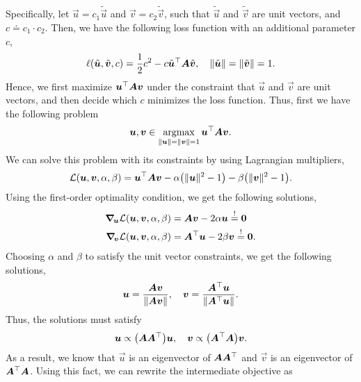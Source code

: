 Specifically, let $\vec{u} = c_1 \tilde{\vec{u}}$ and $\vec{v} = c_2 \tilde{\vec{v}}$, such that
$\tilde{\vec{u}}$ and $\tilde{\vec{v}}$ are unit vectors, and $c \doteq c_1 \cdot c_2$. Then, we
have the following loss function with an additional parameter $c$, \[
    \ell(\tilde{\vec{u}}, \tilde{\vec{v}}, c) = \frac{1}{2} c^2 - c \transpose{\tilde{\vec{u}}} \mat{A} \tilde{\vec{v}}, \quad \| \tilde{\vec{u}} \| = \| \tilde{\vec{v}} \| = 1.
\]
Hence, we first maximize $\transpose{\vec{u}} \mat{A} \vec{v}$ under the constraint that $\vec{u}$
and $\vec{v}$ are unit vectors, and then decide which $c$ minimizes the loss function. Thus, first
we have the following problem \[
    \vec{u}, \vec{v} \in \argmax_{\| \vec{u} \| = \| \vec{v} \| = 1} \transpose{\vec{u}} \mat{A} \vec{v}.
\]
We can solve this problem with its constraints by using Lagrangian multipliers, \[
    \mathcal{L}(\vec{u}, \vec{v}, \alpha, \beta) = \transpose{\vec{u}} \mat{A} \vec{v} - \alpha \lft(\| \vec{u} \|^2 - 1\rgt) - \beta \lft(\| \vec{v} \|^2 - 1\rgt).
\]
Using the first-order optimality condition, we get the following solutions,
\begin{align*}
    \grad{\mathcal{L}(\vec{u}, \vec{v}, \alpha, \beta)}{\vec{u}} & = \mat{A} \vec{v} - 2 \alpha \vec{u} \overset{!}{=} \vec{0}             \\
    \grad{\mathcal{L}(\vec{u}, \vec{v}, \alpha, \beta)}{\vec{v}} & = \transpose{\mat{A}} \vec{u} - 2 \beta \vec{v} \overset{!}{=} \vec{0}.
\end{align*}
Choosing $\alpha$ and $\beta$ to satisfy the unit vector constraints, we get the following solutions, \[
    \vec{u} = \frac{\mat{A} \vec{v}}{\| \mat{A} \vec{v} \|}, \quad \vec{v} = \frac{\transpose{\mat{A}} \vec{u}}{\| \transpose{\mat{A}} \vec{u} \|}.
\]
Thus, the solutions must satisfy \[
    \vec{u} \propto \lft( \mat{A}\transpose{\mat{A}} \rgt) \vec{u}, \quad \vec{v} \propto \lft( \transpose{\mat{A}} \mat{A} \rgt) \vec{v}.
\]
As a result, we know that $\vec{u}$ is an eigenvector of $\mat{A} \transpose{\mat{A}}$ and
$\vec{v}$ is an eigenvector of $\transpose{\mat{A}} \mat{A}$. Using this fact, we can rewrite the
intermediate objective as
